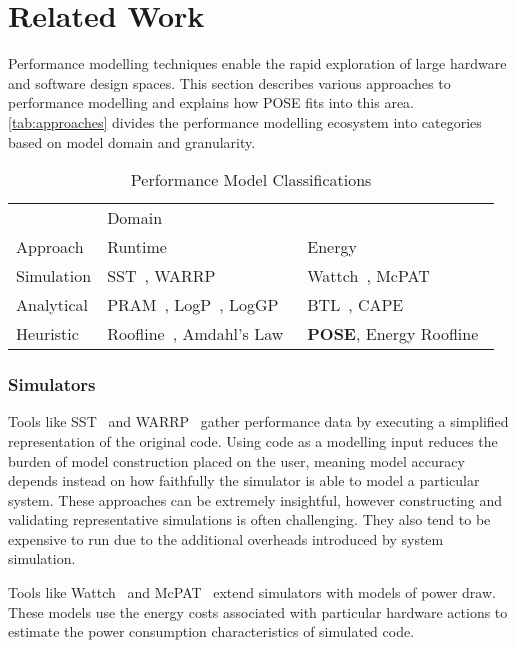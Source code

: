 \section{Related Work}
\label{sec:related}
\noindent
Performance modelling techniques enable the rapid exploration of large hardware and software design spaces.
This section describes various approaches to performance modelling and explains how POSE fits into this area.
\autoref{tab:approaches} divides the performance modelling ecosystem into categories based on model domain and granularity.

\begin{table}
  \centering
  \scriptsize
  \setlength{\tabcolsep}{.7em} 
  \caption{Performance Model Classifications}
  \begin{tabular}{lll}
  \toprule
    & \multicolumn{2}{l}{Domain}\\ \cmidrule(){2-3}
    Approach & Runtime & Energy \\
    \midrule
  Simulation & SST~\cite{rodrigues:2011aa}, WARRP~\cite{hammond:2009aa} & Wattch~\cite{brooks:2000aa}, McPAT~\cite{li:2009aa}  \\
  Analytical & PRAM~\cite{karp:1991aa}, LogP~\cite{culler:1993aa}, LogGP~\cite{alexandrov:1997aa} & BTL~\cite{manousakis:2012aa}, CAPE~\cite{kamble:1997aa} \\
  Heuristic & Roofline~\cite{williams:2009aa}, Amdahl's Law~\cite{amdahl:1967aa} & \textbf{POSE}, Energy Roofline~\cite{choi:2013aa} \\
  \bottomrule
  \end{tabular}
  \label{tab:approaches}
\end{table}

\noindent
\subsubsection{Simulators} 
Tools like SST~\cite{rodrigues:2011aa} and WARRP~\cite{hammond:2009aa} gather performance data by executing a simplified representation of the original code.
Using code as a modelling input reduces the burden of model construction placed on the user, meaning model accuracy depends instead on how faithfully the simulator is able to model a particular system.
These approaches can be extremely insightful, however constructing and validating representative simulations is often challenging.
They also tend to be expensive to run due to the additional overheads introduced by system simulation.

Tools like Wattch~\cite{brooks:2000aa} and McPAT~\cite{li:2009aa} extend simulators with models of power draw.
These models use the energy costs associated with particular hardware actions to estimate the power consumption characteristics of simulated code.

